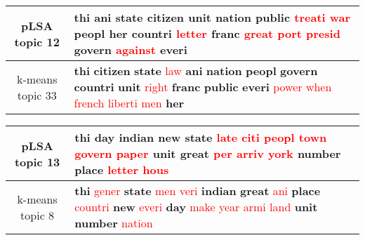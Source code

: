 \begin{center}\begin{tabularx}{\textwidth} {
  | c | >{\raggedright\arraybackslash}X | } \hline 
pLSA topic 12 & \textbf{thi} \textbf{ani} \textbf{state} \textbf{citizen} \textbf{unit} \textbf{nation} \textbf{public} \textcolor{red}{treati} \textcolor{red}{war} \textbf{peopl} \textbf{her} \textbf{countri} \textcolor{red}{letter} \textbf{franc} \textcolor{red}{great} \textcolor{red}{port} \textcolor{red}{presid} \textbf{govern} \textcolor{red}{against} \textbf{everi} \\ \hline 
k-means topic 33 & \textbf{thi} \textbf{citizen} \textbf{state} \textcolor{red}{law} \textbf{ani} \textbf{nation} \textbf{peopl} \textbf{govern} \textbf{countri} \textbf{unit} \textcolor{red}{right} \textbf{franc} \textbf{public} \textbf{everi} \textcolor{red}{power} \textcolor{red}{when} \textcolor{red}{french} \textcolor{red}{liberti} \textcolor{red}{men} \textbf{her} \\ \hline 
\end{tabularx}

\end{center}

\begin{center}\begin{tabularx}{\textwidth} {
  | c | >{\raggedright\arraybackslash}X | } \hline 
pLSA topic 13 & \textbf{thi} \textbf{day} \textbf{indian} \textbf{new} \textbf{state} \textcolor{red}{late} \textcolor{red}{citi} \textcolor{red}{peopl} \textcolor{red}{town} \textcolor{red}{govern} \textcolor{red}{paper} \textbf{unit} \textbf{great} \textcolor{red}{per} \textcolor{red}{arriv} \textcolor{red}{york} \textbf{number} \textbf{place} \textcolor{red}{letter} \textcolor{red}{hous} \\ \hline 
k-means topic 8 & \textbf{thi} \textcolor{red}{gener} \textbf{state} \textcolor{red}{men} \textcolor{red}{veri} \textbf{indian} \textbf{great} \textcolor{red}{ani} \textbf{place} \textcolor{red}{countri} \textbf{new} \textcolor{red}{everi} \textbf{day} \textcolor{red}{make} \textcolor{red}{year} \textcolor{red}{armi} \textcolor{red}{land} \textbf{unit} \textbf{number} \textcolor{red}{nation} \\ \hline 
\end{tabularx}

\end{center}


